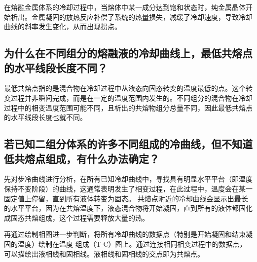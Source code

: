 \documentclass[12pt,hyperref,a4paper,UTF8]{ctexart}
\begin{document}
在熔融金属体系的冷却过程中，当熔体中某一成分达到饱和状态时，纯金属晶体开始析出。金属凝固的放热反应补偿了系统的热量损失，减缓了冷却速度，导致冷却曲线的斜率发生变化，从而出现拐点。
    
\subsection{ 为什么在不同组分的熔融液的冷却曲线上，最低共熔点的水平线段长度不同？}
    
    最低共熔点指的是混合物在冷却过程中从液态向固态转变的温度最低的点。这个转变过程并非瞬间完成，而是在一定的温度范围内发生的。不同组分的混合物在冷却过程中的相变温度范围可能不同，且析出的共熔物组分总量不同，因此最低共熔点的水平线段长度也就不同。
    
\subsection{ 若已知二组分体系的许多不同组成的冷曲线，但不知道低共熔点组成，有什么办法确定？}
先对步冷曲线进行分析，在所有已知冷却曲线中，寻找具有明显水平平台（即温度保持不变阶段）的曲线，这通常表明发生了相变过程，在此过程中，温度会在某一固定值上停留，直到所有液体转变为固态。
共熔点附近的冷却曲线会显示出最长的水平平台，因为在共熔温度下，液态混合物将开始凝固，直到所有的液体都固化成固态共熔组成，这个过程需要释放大量的热。

再通过绘制相图进一步判断，将所有冷却曲线的数据点（特别是开始凝固和结束凝固的温度）绘制在温度-组成（T-C）图上。通过连接相同相变过程中的数据点，可以描绘出液相线和固相线。液相线和固相线的交点即为共熔点。



\clearpage
\end{document}
